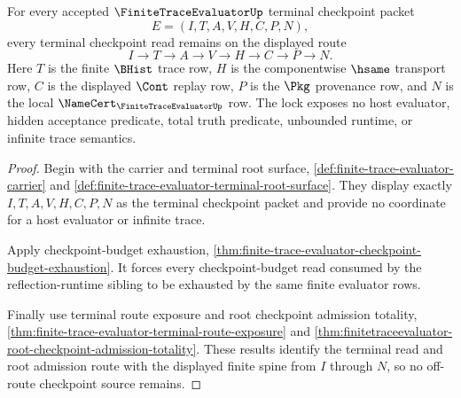 \begin{theorem}
\label{thm:finite-trace-evaluator-terminal-runtime-checkpoint-lock}
For every accepted $\FiniteTraceEvaluatorUp$ terminal checkpoint packet
$$
E=(I,T,A,V,H,C,P,N),
$$
every terminal checkpoint read remains on the displayed route
$$
I \to T \to A \to V \to H \to C \to P \to N.
$$
Here $T$ is the finite $\BHist$ trace row, $H$ is the componentwise $\hsame$
transport row, $C$ is the displayed $\Cont$ replay row, $P$ is the $\Pkg$
provenance row, and $N$ is the local
$\NameCert_{\FiniteTraceEvaluatorUp}$ row. The lock exposes no host evaluator,
hidden acceptance predicate, total truth predicate, unbounded runtime, or
infinite trace semantics.
\end{theorem}
\begin{proof}
Begin with the carrier and terminal root surface,
\autoref{def:finite-trace-evaluator-carrier} and
\autoref{def:finite-trace-evaluator-terminal-root-surface}. They display
exactly $I,T,A,V,H,C,P,N$ as the terminal checkpoint packet and provide no
coordinate for a host evaluator or infinite trace.

Apply checkpoint-budget exhaustion,
\autoref{thm:finite-trace-evaluator-checkpoint-budget-exhaustion}. It forces
every checkpoint-budget read consumed by the reflection-runtime sibling to be
exhausted by the same finite evaluator rows.

Finally use terminal route exposure and root checkpoint admission totality,
\autoref{thm:finite-trace-evaluator-terminal-route-exposure} and
\autoref{thm:finitetraceevaluator-root-checkpoint-admission-totality}. These
results identify the terminal read and root admission route with the displayed
finite spine from $I$ through $N$, so no off-route checkpoint source remains.
\end{proof}

